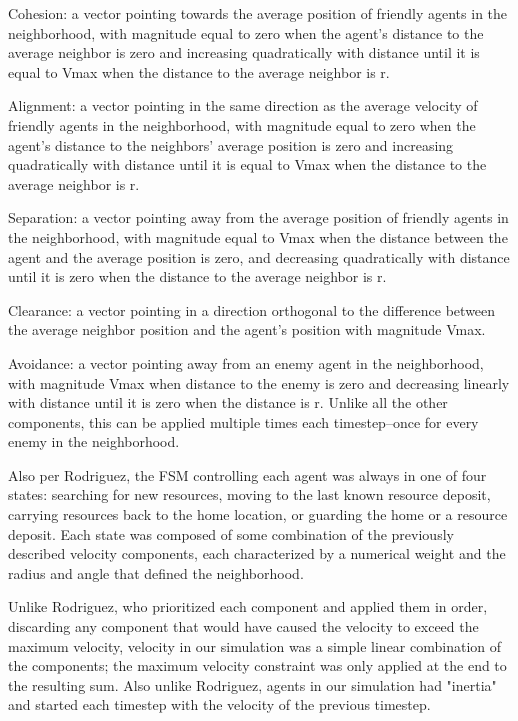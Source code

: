 \documentclass[12pt,journal,compsoc]{IEEEtran}
\begin{document}
Cohesion: a vector pointing towards the average position of friendly agents in the neighborhood, with magnitude equal to zero when the agent's distance to the average neighbor is zero and increasing quadratically with distance until it is equal to Vmax when the distance to the average neighbor is r.

Alignment: a vector pointing in the same direction as the average velocity of friendly agents in the neighborhood, with magnitude equal to zero when the agent's distance to the neighbors' average position is zero and increasing quadratically with distance until it is equal to Vmax when the distance to the average neighbor is r.

Separation: a vector pointing away from the average position of friendly agents in the neighborhood, with magnitude equal to Vmax when the distance between the agent and the average position is zero, and decreasing quadratically with distance until it is zero when the distance to the average neighbor is r.


Clearance: a vector pointing in a direction orthogonal to the difference between the average neighbor position and the agent's position with magnitude Vmax.

Avoidance: a vector pointing away from an enemy agent in the neighborhood, with magnitude Vmax when distance to the enemy is zero and decreasing linearly with distance until it is zero when the distance is r. Unlike all the other components, this can be applied multiple times each timestep--once for every enemy in the neighborhood.

Also per Rodriguez, the FSM controlling each agent was always in one of four states: searching for new resources, moving to the last known resource deposit, carrying resources back to the home location, or guarding the home or a resource deposit. Each state was composed of some combination of the previously described velocity components, each characterized by a numerical weight and the radius and angle that defined the neighborhood.

Unlike Rodriguez, who prioritized each component and applied them in order, discarding any component that would have caused the velocity to exceed the maximum velocity, velocity in our simulation was a simple linear combination of the components; the maximum velocity constraint was only applied at the end to the resulting sum. Also unlike Rodriguez, agents in our simulation had "inertia" and started each timestep with the velocity of the previous timestep.
\end{document}
